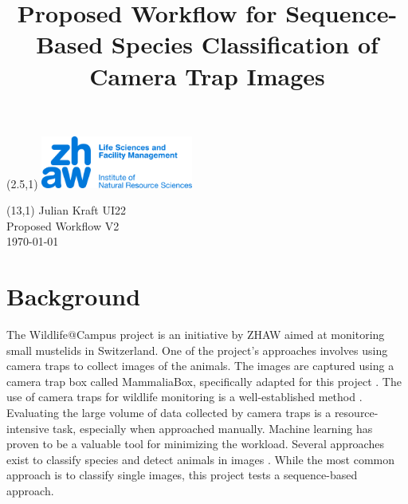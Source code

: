 \documentclass{article}
\title{Proposed Workflow for Sequence-Based Species Classification of Camera Trap Images}
\makeatletter
\renewcommand{\maketitle}{
  \begin{flushleft} 
    \Large\textmd{\@title} 
    \par
  \end{flushleft}
}
\makeatother
\begin{document}
\begin{textblock}{5}(2.5,1) %
  \includegraphics[width=5cm]{resources/logo.jpg} %
\end{textblock}

\begin{textblock}{6}(13,1) %
        \raggedleft
        Julian Kraft UI22\\
        Proposed Workflow V2\\
        \today
\end{textblock}

\vspace*{1.5cm}


\maketitle

\section*{Background} %

The Wildlife@Campus project is an initiative by ZHAW aimed at monitoring small mustelids in Switzerland.
One of the project's approaches involves using camera traps to collect images of the animals.
The images are captured using a camera trap box called MammaliaBox, specifically adapted for this
project \autocite{grafWildlifeCampusKleineSaeugetiere2022}.
The use of camera traps for wildlife monitoring is a well-established method \autocite{cordierCameraTrapResearch2022, 
beaudrotStandardizedAssessmentBiodiversity2016}.
Evaluating the large volume of data collected by camera traps
is a resource-intensive task, especially when approached manually. Machine learning
has proven to be a valuable tool for minimizing the workload. Several approaches exist to classify species and
detect animals in images \autocite{tabakMachineLearningClassify2019, bohnerSemiautomaticWorkflowProcess2023}.
While the most common approach is to classify single images, this project tests a sequence-based approach.
\end{document}
